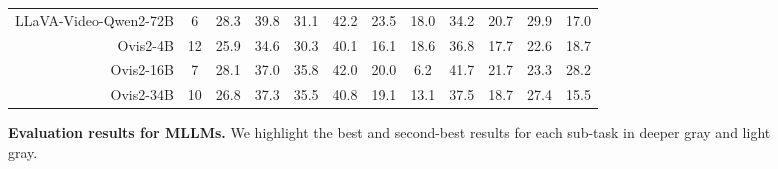 \documentclass{article}
\begin{document}
\begin{figure}[ht!]
{\begin{tabular}{r|cc|ccccccccc}
LLaVA-Video-Qwen2-72B & 6 & 28.3 & 39.8 & 31.1 & 42.2 & 23.5 & 18.0 & 34.2 & 20.7 & 29.9 & 17.0 \\
Ovis2-4B & 12 & 25.9 & 34.6 & 30.3 & 40.1 & 16.1 & 18.6 & 36.8 & 17.7 & 22.6 & 18.7 \\
Ovis2-16B & 7 & 28.1 & 37.0 & \cellcolor{deeper-gray}35.8 & 42.0 & 20.0 & 6.2 & 41.7 & 21.7 & 23.3 & 28.2 \\
Ovis2-34B & 10 & 26.8 & 37.3 & \cellcolor{light-gray}35.5 & 40.8 & 19.1 & 13.1 & 37.5 & 18.7 & 27.4 & 15.5 \\
\hline
\end{tabular}
}
\vspace{-0.3cm}
\caption{\textbf{Evaluation results for MLLMs.} We highlight the best and second-best results for each sub-task in \colorbox{deeper-gray}{deeper gray} and \colorbox{light-gray}{light gray}.}
\label{tab:main_table}
\vspace{-0.5cm}
\end{figure}
\end{document}
